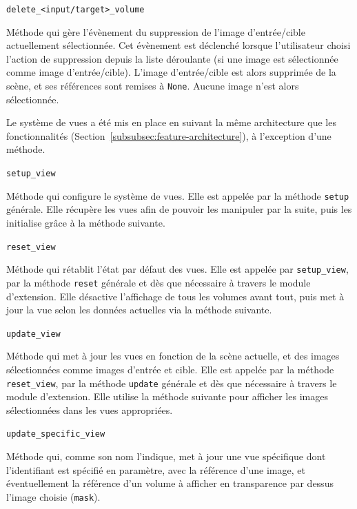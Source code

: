 \documentclass{article}
\newcommand{\method}[1]{\hspace{1in}\texttt{#1}\bigskip}
\begin{document}
{{{            \bigskip
            \method{delete\_<input/target>\_volume}

            Méthode qui gère l'évènement du suppression de l'image d'entrée/cible actuellement sélectionnée. Cet évènement est déclenché lorsque l'utilisateur choisi l'action de suppression depuis la liste déroulante (si une image est sélectionnée comme image d'entrée/cible). L'image d'entrée/cible est alors supprimée de la scène, et ses références sont remises à \texttt{None}. Aucune image n'est alors sélectionnée.

            \bigskip

            Le système de vues a été mis en place en suivant la même architecture que les fonctionnalités (Section~\ref{subsubsec:feature-architecture}), à l'exception d'une méthode.

            \bigskip
            \method{setup\_view}

            Méthode qui configure le système de vues. Elle est appelée par la méthode \texttt{setup} générale. Elle récupère les vues afin de pouvoir les manipuler par la suite, puis les initialise grâce à la méthode suivante.

            \bigskip
            \method{reset\_view}

            Méthode qui rétablit l'état par défaut des vues. Elle est appelée par \texttt{setup\_view}, par la méthode \texttt{reset} générale et dès que nécessaire à travers le module d'extension. Elle désactive l'affichage de tous les volumes avant tout, puis met à jour la vue selon les données actuelles via la méthode suivante.

            \bigskip
            \method{update\_view}

            Méthode qui met à jour les vues en fonction de la scène actuelle, et des images sélectionnées comme images d'entrée et cible. Elle est appelée par la méthode \texttt{reset\_view}, par la méthode \texttt{update} générale et dès que nécessaire à travers le module d'extension. Elle utilise la méthode suivante pour afficher les images sélectionnées dans les vues appropriées.

            \bigskip
            \method{update\_specific\_view}

            Méthode qui, comme son nom l'indique, met à jour une vue spécifique dont l'identifiant est spécifié en paramètre, avec la référence d'une image, et éventuellement la référence d'un volume à afficher en transparence par dessus l'image choisie (\texttt{mask}).
        }
    }

}
\end{document}
